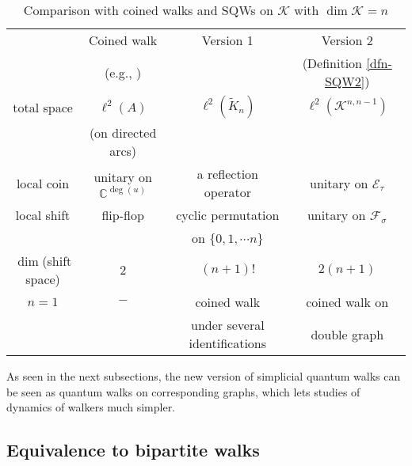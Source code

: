 \documentclass[a4paper,12pt]{article}
\numberwithin{equation}{section}
\begin{document}
\begin{table}[h]
\caption{Comparison with coined walks and SQWs on $\mathcal{K}$ with $\dim \mathcal{K} = n$}
\begin{center}
\begin{tabular}{|c|c|c|c|}
\hline
 & Coined walk & Version 1 \cite{MOSver1} & Version 2 \\
 & (e.g., \cite{HKSS2}) &  &  (Definition \ref{dfn-SQW2}) \\[2mm] \hline
%
total space & $\ell^2(A)$ & $\ell^2(\tilde K_n)$ & $\ell^2(\mathcal{K}^{n,n-1})$  \\
 & (on directed arcs) &  &   \\[2mm]
%
local coin & unitary on $\mathbb{C}^{\deg(u)}$ & a reflection operator &  unitary on $\mathcal{E}_\tau$  \\[2mm]
%
local shift & flip-flop & cyclic permutation  & unitary on $\mathcal{F}_\sigma$ \\
 	& & on $\{0,1,\cdots n\}$ & \\[2mm]
$\dim$(shift space) & $2$ & $(n+1)!$ & $2(n+1)$ \\[2mm]
%
$n=1$ & $-$ & coined walk & coined walk on \\
 & & under several identifications & double graph \\[2mm]
\hline
\end{tabular}
\end{center}
\label{table-SQW}
\end{table}%


As seen in the next subsections, the new version of simplicial quantum walks can be seen as quantum walks on corresponding graphs, which lets studies of dynamics of walkers much simpler.


\subsection{Equivalence to bipartite walks}
\end{document}
